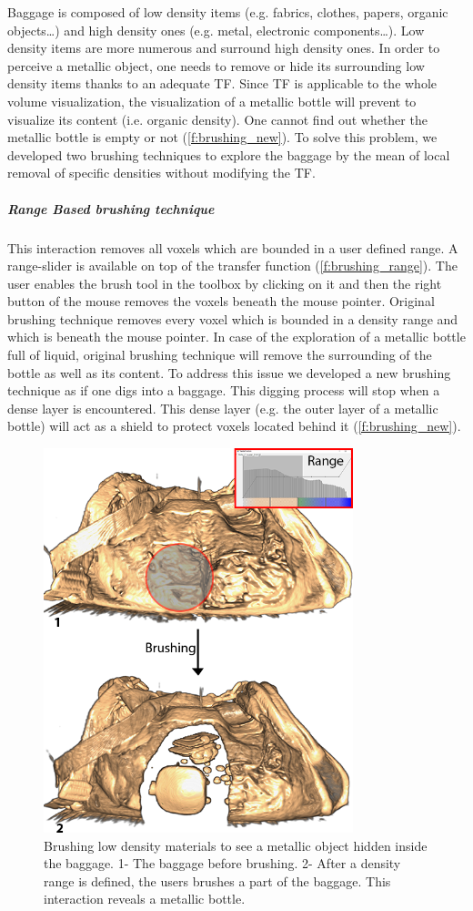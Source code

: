 Baggage is composed of low density items (e.g. fabrics, clothes, papers, organic objects…) and high density ones (e.g. metal, electronic components…). Low density items are more numerous and surround high density ones. In order to perceive a metallic object, one needs to remove or hide its surrounding low density items thanks to an adequate TF. Since TF is applicable to the whole volume visualization, the visualization of a metallic bottle will prevent to visualize its content (i.e. organic density). One cannot find out whether the metallic bottle is empty or not (\autoref{f:brushing_new}). To solve this problem, we developed two brushing techniques to explore the baggage by the mean of local removal of specific densities without modifying the TF.

\subparagraph{Range Based brushing technique}

This interaction removes all voxels which are bounded in a user defined range. A range-slider is available on top of the transfer function (\autoref{f:brushing_range}). The user enables the brush tool in the toolbox by clicking on it and then the right button of the mouse removes the voxels beneath the mouse pointer.
Original brushing technique removes every voxel which is bounded in a density range and which is beneath the mouse pointer. In case of the exploration of a metallic bottle full of liquid, original brushing technique will remove the surrounding of the bottle as well as its content. To address this issue we developed a new brushing technique as if one digs into a baggage. This digging process will stop when a dense layer is encountered. This dense layer (e.g. the outer layer of a metallic bottle) will act as a shield to protect voxels located behind it (\autoref{f:brushing_new}).

 \begin{figure}
\centering	\includegraphics[width=9cm]{Figures/brushing-range.png}
	\caption{ Brushing low density materials to see a metallic object hidden inside the baggage. 1- The baggage before brushing. 2- After a density range is defined, the users brushes a part of the baggage. This interaction reveals a metallic bottle.   }
	\label{f:brushing_range}
\end{figure}

